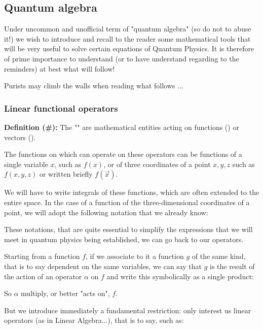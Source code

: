 	\pagebreak
	\subsection{Quantum algebra}
	Under uncommon and unofficial term of "quantum algebra" (so do not to abuse it!) we wish to introduce and recall to the reader some mathematical tools  that will be very useful to solve certain equations of Quantum Physics. It is therefore of prime importance to understand (or to have understand regarding to the reminders) at best what will follow!
	
	\begin{tcolorbox}[title=Remark,colframe=black,arc=10pt]
	Purists may climb the walls when reading what follows ...
	\end{tcolorbox}
	
	\subsubsection{Linear functional operators}
	\textbf{Definition (\#\mydef):} The "" are mathematical entities acting on functions () or vectors ().

	The functions on which can operate on these operators can be functions of a single variable $x$, such as $f (x)$, or of three coordinates of a point $x, y, z$ such as $f (x, y, z)$ or written briefly $f(\vec{x})$.

	We will have to write integrals of these functions, which are often extended to the entire space. In the case of a function of the three-dimensional coordinates of a point, we will adopt the following notation that we already know:
	
	These notations, that are quite essential to simplify the expressions that we will meet in quantum physics being established, we can go back to our operators.

	Starting from a function $f$, if we associate to it a function $g$ of the same kind, that is to say dependent on the same variables, we can say that $g$ is the result of the action of an operator $\alpha$ on $f$ and write this symbolically as a single product:
	
	So $\alpha$ multiply, or better "acts on", $f$.
	
	But we introduce immediately a fundamental restriction: only interest us linear operators (as in Linear Algebra...), that is to say, such as:
	
